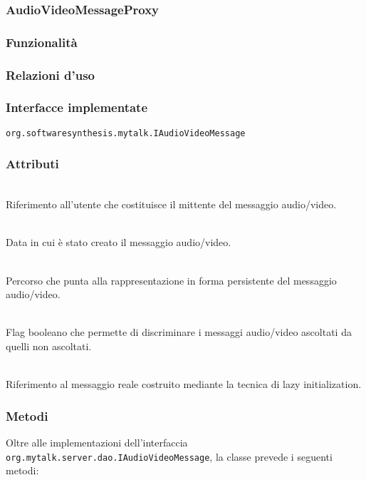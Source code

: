 \subsubsection{AudioVideoMessageProxy}\label{sec:audiovideomessageproxy}

\subsubsection*{Funzionalità}

\subsubsection*{Relazioni d'uso}

\subsubsection*{Interfacce implementate}
\texttt{org.softwaresynthesis.mytalk.IAudioVideoMessage}

\subsubsection*{Attributi}
\begin{description}
  \item{}\\
Riferimento all'utente che costituisce il mittente del messaggio audio/video.
  \item{}\\
Data in cui è stato creato il messaggio audio/video.
  \item{}\\
Percorso che punta alla rappresentazione in forma persistente del messaggio audio/video.
  \item{}\\
Flag booleano che permette di discriminare i messaggi audio/video ascoltati da quelli non ascoltati.
  \item{}\\
Riferimento al messaggio reale costruito mediante la tecnica di lazy initialization.
\end{description}

\subsubsection*{Metodi}
Oltre alle implementazioni dell'interfaccia \texttt{org.mytalk.server.dao.IAudioVideoMessage}, la classe prevede i seguenti metodi:
\begin{description}
\item{}\\
\end{description}

